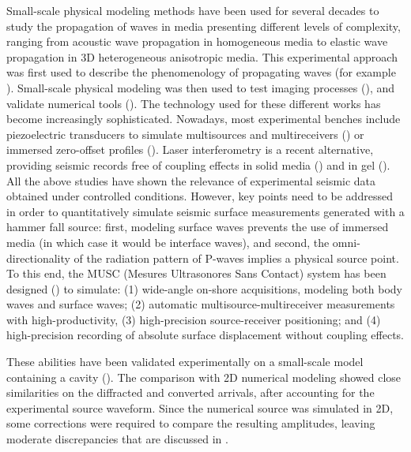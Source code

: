\documentclass[extra,mreferee]{gji}
\begin{document}
Small-scale physical modeling methods have been used for several decades to study the propagation of waves in media presenting different levels of complexity, ranging from acoustic wave propagation in homogeneous media to elastic wave propagation in 3D heterogeneous anisotropic media. This experimental approach was first used to describe the phenomenology of propagating waves (for example \cite{rieber1936ewp,howes1953sms,oliver1954two,angona1960two,obrien1971model}). Small-scale physical modeling was then used to test imaging processes (\cite{hilterman1970tdm,french1974mrp,bishop1985lvm,pratt1999fwi,mo2015development}), and validate numerical tools (\cite{favretto2013nmt}). The technology used for these different works has become increasingly sophisticated. Nowadays, most experimental benches include piezoelectric transducers to simulate multisources and multireceivers (\cite{wong2009spm}) or immersed zero-offset profiles (\cite{favretto2013nmt}). Laser interferometry is a recent alternative, providing seismic records free of coupling effects in solid media (\cite{bodet2005swi,vanwijk2006eir,bretaudeau2011ssm,bretaudeau2013fwi}) and in gel (\cite{decaqueray2011ewi}). All the above studies have shown the relevance of experimental seismic data obtained under controlled conditions. However, key points need to be addressed in order to quantitatively simulate seismic surface measurements generated with a hammer fall source: first, modeling surface waves prevents the use of immersed media (in which case it would be interface waves), and second, the omni-directionality of the radiation pattern of P-waves implies a physical source point. To this end, the MUSC (Mesures Ultrasonores Sans Contact) system has been designed (\cite{bretaudeau2011ssm}) to simulate: (1) wide-angle on-shore acquisitions, modeling both body waves and surface waves; (2) automatic multisource-multireceiver measurements with high-productivity, (3) high-precision source-receiver positioning; and (4) high-precision recording of absolute surface displacement without coupling effects. 

These abilities have been validated experimentally on a small-scale model containing a cavity (\cite{bretaudeau2011ssm}). The comparison with 2D numerical modeling showed close similarities on the diffracted and converted arrivals, after accounting for the experimental source waveform. Since the numerical source was simulated in 2D, some corrections were required to compare the resulting amplitudes, leaving moderate discrepancies that are discussed in \cite{bretaudeau2011ssm}. 
\end{document}
